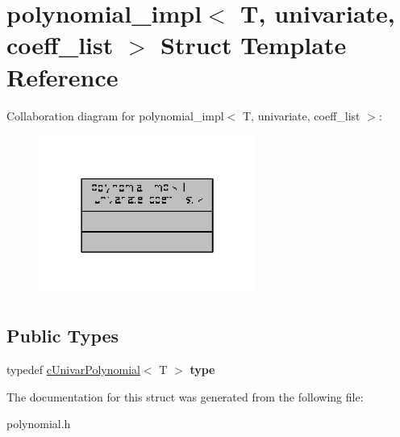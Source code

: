 \hypertarget{structpolynomial__impl_3_01T_00_01univariate_00_01coeff__list_01_4}{\section{polynomial\-\_\-impl$<$ T, univariate, coeff\-\_\-list $>$ Struct Template Reference}
\label{structpolynomial__impl_3_01T_00_01univariate_00_01coeff__list_01_4}
}


Collaboration diagram for polynomial\-\_\-impl$<$ T, univariate, coeff\-\_\-list $>$\-:
\nopagebreak
\begin{figure}[H]
\begin{center}
\leavevmode
\includegraphics[width=202pt]{structpolynomial__impl_3_01T_00_01univariate_00_01coeff__list_01_4__coll__graph}
\end{center}
\end{figure}
\subsection*{Public Types}
\begin{DoxyCompactItemize}
\item 
\hypertarget{structpolynomial__impl_3_01T_00_01univariate_00_01coeff__list_01_4_a5d69c607e978668acbf8085f3dd8559a}{typedef \hyperlink{classcUnivarPolynomial}{c\-Univar\-Polynomial}$<$ T $>$ {\bfseries type}}\label{structpolynomial__impl_3_01T_00_01univariate_00_01coeff__list_01_4_a5d69c607e978668acbf8085f3dd8559a}

\end{DoxyCompactItemize}


The documentation for this struct was generated from the following file\-:\begin{DoxyCompactItemize}
\item 
polynomial.\-h\end{DoxyCompactItemize}
